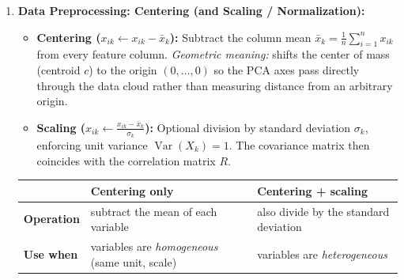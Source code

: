 \documentclass[10pt,a4paper]{article}
\begin{document}
\begin{enumerate}[leftmargin=18pt, itemsep=5pt, topsep=2pt]
    \item \textbf{Data Preprocessing: Centering (and Scaling / Normalization):}
    \begin{itemize}[leftmargin=12pt, itemsep=2pt]
        \item \textbf{Centering ($x_{ik} \leftarrow x_{ik} - \bar{x}_k$):} Subtract the column mean $\bar{x}_k = \frac{1}{n}\sum_{i=1}^n x_{ik}$ from every feature column.
        \textit{Geometric meaning:} shifts the center of mass (centroid $c$) to the origin $(0, \dots, 0)$ so the PCA axes pass directly through the data cloud rather than measuring distance from an arbitrary origin.
        \item \textbf{Scaling ($x_{ik} \leftarrow \frac{x_{ik} - \bar{x}_k}{\sigma_k}$):} Optional division by standard deviation $\sigma_k$, enforcing unit variance $\operatorname{Var}(X_k) = 1$. The covariance matrix then coincides with the correlation matrix $R$.
    \end{itemize}

    \vspace{2pt}
    \begin{center}
    \small
    \begin{tabular}{lll}
    \toprule
    \rowcolor{lightbg}
     & \textbf{Centering only} & \textbf{Centering + scaling} \\
    \midrule
    \textbf{Operation} & subtract the mean of each variable & also divide by the standard deviation \\
    \addlinespace[2pt]
    \textbf{Use when} & variables are \textit{homogeneous} (same unit, scale) & variables are \textit{heterogeneous} \\
    \bottomrule
    \end{tabular}
    \end{center}
    \vspace{2pt}


\end{enumerate}
\end{document}
